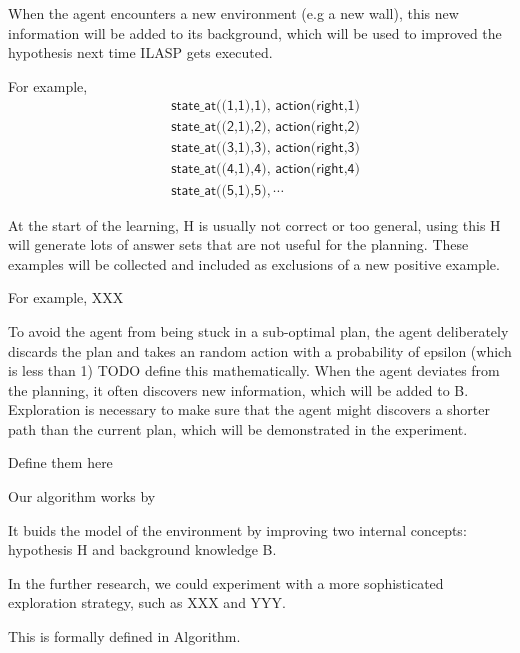 When the agent encounters a new environment (e.g a new wall), this new information will be added to its background, which will be used to improved the hypothesis 
next time ILASP gets executed. 

For example, 
\begin{equation*}
\begin{split}
&\textsf{state\_at((1,1),1), action(right,1)}\\
&\textsf{state\_at((2,1),2), action(right,2)}\\
&\textsf{state\_at((3,1),3), action(right,3)}\\
&\textsf{state\_at((4,1),4), action(right,4)}\\
&\textsf{state\_at((5,1),5)}, \cdots
\end{split}
\end{equation*}
    

At the start of the learning, H is usually not correct or too general, using this H will generate lots of answer sets that are not useful for the planning. 
These examples will be collected and included as exclusions of a new positive example. 

For example, 
XXX


To avoid the agent from being stuck in a sub-optimal plan, the agent deliberately discards the plan and takes an random action with a probability of 
epsilon (which is less than 1) TODO define this mathematically. 
When the agent deviates from the planning, it often discovers new information, which will be added to B.
Exploration is necessary to make sure that the agent might discovers a shorter path than the current plan, which will be demonstrated in the experiment. 

Define them here

Our algorithm works by 

It buids the model of the environment by improving two internal concepts: hypothesis H and background knowledge B. 

In the further research, we could experiment with a more sophisticated exploration strategy, such as XXX and YYY. 

This is formally defined in Algorithm. 

